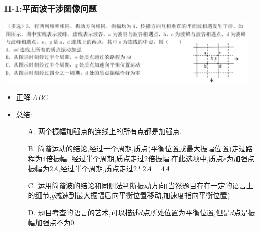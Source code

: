 \documentclass{article}
\begin{document}
\vspace{2em}

\subsubsection{II-1:平面波干涉图像问题}
\includegraphics[width = 0.95\textwidth]{./pictures/2.1-3.png}

\begin{itemize}
    \item 正解:\quad $ABC$
    \item 总结:\quad
          \begin{itemize}
              \item[A.] 两个振幅加强点的连线上的所有点都是加强点.
              \item[B.] 简谐运动的结论,经过一个周期,质点(平衡位置或最大振幅位置)走过路程为4倍振幅.
                  经过半个周期,质点走过2倍振幅.在此选项中,质点$e$为加强点振幅为$2A$,经过半个周期,质点走过$2*2A = 4A$
              \item[C.] 运用简谐波的结论和同侧法判断振动方向(当然题目存在一定的语言上的细节,$g$减速到最大振幅后向平衡位置移动,加速度指向平衡位置)
              \item[D.] 题目考查的语言的艺术,可以描述$d$点所处位置为平衡位置,但是$d$点是振幅加强点不为$0$
          \end{itemize}
\end{itemize}

\vspace{2em}
\end{document}
